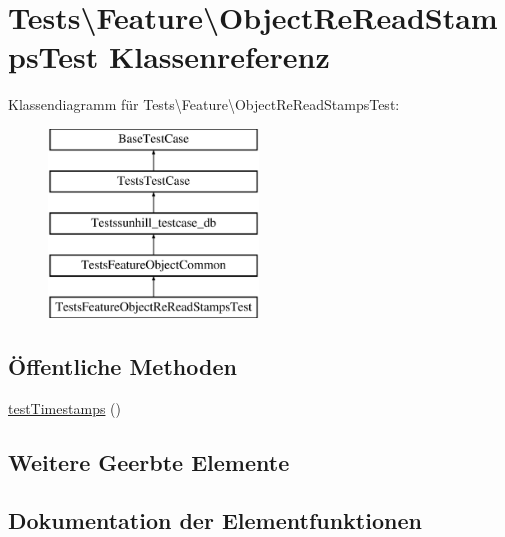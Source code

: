 \hypertarget{classTests_1_1Feature_1_1ObjectReReadStampsTest}{}\section{Tests\textbackslash{}Feature\textbackslash{}Object\+Re\+Read\+Stamps\+Test Klassenreferenz}
\label{classTests_1_1Feature_1_1ObjectReReadStampsTest}
Klassendiagramm für Tests\textbackslash{}Feature\textbackslash{}Object\+Re\+Read\+Stamps\+Test\+:\begin{figure}[H]
\begin{center}
\leavevmode
\includegraphics[height=5.000000cm]{d5/d20/classTests_1_1Feature_1_1ObjectReReadStampsTest}
\end{center}
\end{figure}
\subsection*{Öffentliche Methoden}
\begin{DoxyCompactItemize}
\item 
\hyperlink{classTests_1_1Feature_1_1ObjectReReadStampsTest_a7a93d0dc4c42cfd303faf8b7f98e869e}{test\+Timestamps} ()
\end{DoxyCompactItemize}
\subsection*{Weitere Geerbte Elemente}


\subsection{Dokumentation der Elementfunktionen}
\mbox{\label{classTests_1_1Feature_1_1ObjectReReadStampsTest_a7a93d0dc4c42cfd303faf8b7f98e869e}} 
